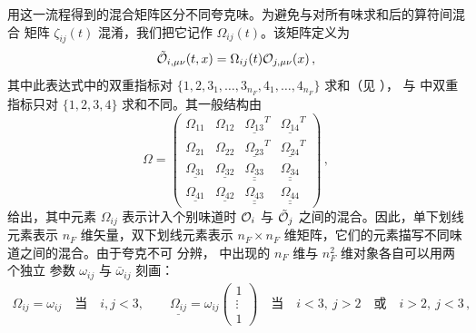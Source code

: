 用这一流程得到的混合矩阵区分不同夸克味。为避免与对所有味求和后的算符间混合
矩阵 $\zeta_{ij}(t)$ 混淆，我们把它记作 $\Omega_{ij}(t)$。该矩阵定义为
\begin{equation}
	\tilde{\mathcal{O}}_{i, \mu \nu} (t, x) = \Omega_{i j} (t) \mathcal{O}_{j, \mu \nu} (x) \, ,
\end{equation}
其中此表达式中的双重指标对 $\{1, 2,
3_1,\ldots, 3_{n_F}, 4_1,\ldots,4_{n_F}\}$ 求和（见 ），
与  中双重指标只对 $\{1, 2, 3, 4\}$ 求和不同。其一般结构由
\begin{equation}
	\Omega =
	\begin{pmatrix}
		\Omega_{1 1} & \Omega_{1 2} & \underline{\Omega_{1 3}}^T & \underline{\Omega_{1 4}}^T \\
		\Omega_{2 1} & \Omega_{2 2} & \underline{\Omega_{2 3}}^T & \underline{\Omega_{2 4}}^T \\
		\underline{\Omega_{3 1}} & \underline{\Omega_{3 2}} & \underline{\underline{\Omega_{3 3}}} & \underline{\underline{\Omega_{3 4}}} \\
		\underline{\Omega_{4 1}} & \underline{\Omega_{4 2}} & \underline{\underline{\Omega_{4 3}}} & \underline{\underline{\Omega_{4 4}}}
	\end{pmatrix} \, ,
	\label{eq:Omega}
\end{equation}
给出，其中元素 $\Omega_{i j}$ 表示计入个别味道时 $\mathcal{O}_i$ 与 $\tilde{\mathcal{O}}_j$
之间的混合。因此，单下划线元素表示 $n_F$ 维矢量，双下划线元素表示
$n_F \times n_F$ 维矩阵，它们的元素描写不同味道之间的混合。由于夸克不可
分辨， 中出现的 $n_F$ 维与 $n_F^2$ 维对象各自可以用两个独立
参数 $\omega_{ij}$ 与 $\bar{\omega}_{ij}$ 刻画：
\begin{equation*}
	\begin{split}
		\Omega_{i j} = \omega_{i j} \quad \text{当} \quad i,j <
                3, \qquad
		\underline{\Omega_{i j}} = \omega_{i j}
		\begin{pmatrix}
			1 \\
			\vdots \\
			1
		\end{pmatrix} \quad \text{当} \quad i < 3,\
                j > 2 \quad \text{或} \quad i > 2,\ j < 3\,,
	\end{split}
\end{equation*}
